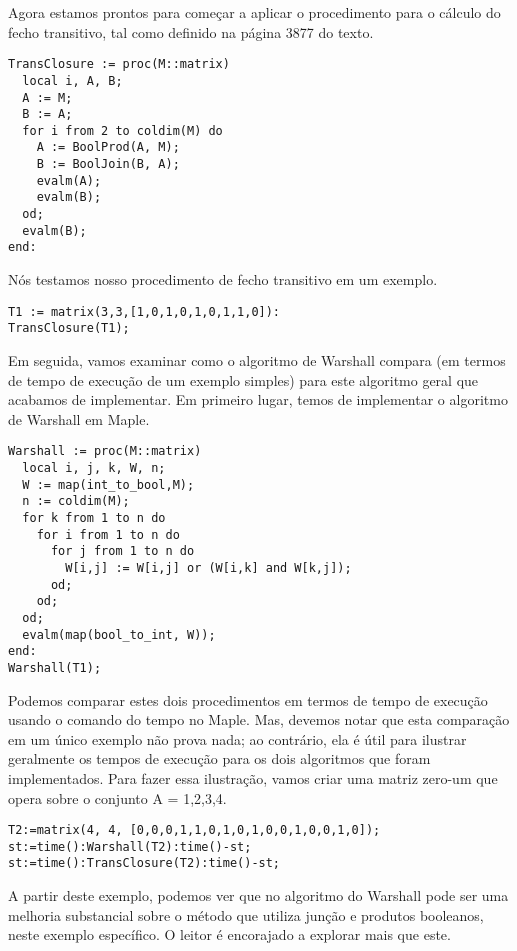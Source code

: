 \documentclass[a4paper]{article}
\begin{document}
Agora estamos prontos para começar a aplicar o procedimento para o cálculo do fecho transitivo, tal como definido na página 3877 do texto.

\begin{lstlisting}
TransClosure := proc(M::matrix)
  local i, A, B;
  A := M;
  B := A;
  for i from 2 to coldim(M) do
    A := BoolProd(A, M);
    B := BoolJoin(B, A);
    evalm(A);
    evalm(B);
  od;
  evalm(B);
end:
\end{lstlisting}

Nós testamos nosso procedimento de fecho transitivo em um exemplo.

\begin{lstlisting}
T1 := matrix(3,3,[1,0,1,0,1,0,1,1,0]):
TransClosure(T1);
\end{lstlisting}

Em seguida, vamos examinar como o algoritmo de Warshall compara (em termos de tempo de execução de um exemplo simples) para este algoritmo geral que acabamos de implementar. Em primeiro lugar, temos de implementar o algoritmo de Warshall em Maple.

\begin{lstlisting}
Warshall := proc(M::matrix)
  local i, j, k, W, n;
  W := map(int_to_bool,M);
  n := coldim(M);
  for k from 1 to n do
    for i from 1 to n do
      for j from 1 to n do
        W[i,j] := W[i,j] or (W[i,k] and W[k,j]);
      od;
    od;
  od;
  evalm(map(bool_to_int, W));
end:
Warshall(T1);
\end{lstlisting}

Podemos comparar estes dois procedimentos em termos de tempo de execução usando o comando do tempo no Maple. Mas, devemos notar que esta comparação em um único exemplo não prova nada; ao contrário, ela é útil para ilustrar geralmente os tempos de execução para os dois algoritmos que foram implementados. Para fazer essa ilustração, vamos criar uma matriz zero-um que opera sobre o conjunto A = {1,2,3,4}.

\begin{lstlisting}
T2:=matrix(4, 4, [0,0,0,1,1,0,1,0,1,0,0,1,0,0,1,0]);
st:=time():Warshall(T2):time()-st;
st:=time():TransClosure(T2):time()-st;
\end{lstlisting}

A partir deste exemplo, podemos ver que no algoritmo do Warshall pode ser uma melhoria substancial sobre o método que utiliza junção e produtos booleanos, neste exemplo específico. O leitor é encorajado a explorar mais que este.
\end{document}
